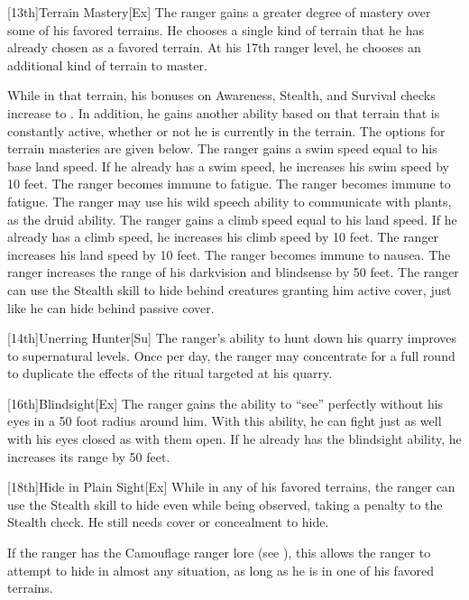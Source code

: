 [13th]{Terrain Mastery}[Ex]
The ranger gains a greater degree of mastery over some of his favored terrains.
He chooses a single kind of terrain that he has already chosen as a favored terrain.
At his 17th ranger level, he chooses an additional kind of terrain to master.
\par While in that terrain, his bonuses on Awareness, Stealth, and Survival checks increase to .
In addition, he gains another ability based on that terrain that is constantly active, whether or not he is currently in the terrain.
The options for terrain masteries are given below.
The ranger gains a swim speed equal to his base land speed.
If he already has a swim speed, he increases his swim speed by 10 feet.
The ranger becomes immune to fatigue.
The ranger becomes immune to fatigue.
The ranger may use his wild speech ability to communicate with plants, as the druid ability.
The ranger gains a climb speed equal to his land speed.
If he already has a climb speed, he increases his climb speed by 10 feet.
The ranger increases his land speed by 10 feet.
The ranger becomes immune to nausea.
The ranger increases the range of his darkvision and blindsense by 50 feet.
The ranger can use the Stealth skill to hide behind creatures granting him active cover, just like he can hide behind passive cover.

[14th]{Unerring Hunter}[Su]
The ranger's ability to hunt down his quarry improves to supernatural levels.
Once per day, the ranger may concentrate for a full round to duplicate the effects of the  ritual targeted at his quarry.

[16th]{Blindsight}[Ex]
The ranger gains the ability to ``see'' perfectly without his eyes in a 50 foot radius around him.
With this ability, he can fight just as well with his eyes closed as with them open.
If he already has the blindsight ability, he increases its range by 50 feet.

[18th]{Hide in Plain Sight}[Ex]
While in any of his favored terrains, the ranger can use the Stealth skill to hide even while being observed, taking a  penalty to the Stealth check.
He still needs cover or concealment to hide.

If the ranger has the Camouflage ranger lore (see ), this allows the ranger to attempt to hide in almost any situation, as long as he is in one of his favored terrains.

